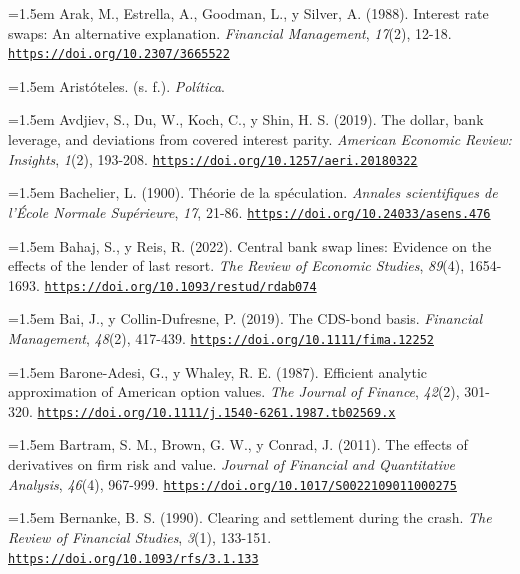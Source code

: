 \documentclass[10pt,a4paper]{article}
\begin{document}
\noindent\hangindent=1.5em Arak, M., Estrella, A., Goodman, L., y Silver, A. (1988). Interest rate swaps: An alternative explanation. \textit{Financial Management}, \textit{17}(2), 12-18. \href{https://doi.org/10.2307/3665522}{\nolinkurl{https://doi.org/10.2307/3665522}}

\noindent\hangindent=1.5em Aristóteles. (s. f.). \textit{Política}.

\noindent\hangindent=1.5em Avdjiev, S., Du, W., Koch, C., y Shin, H. S. (2019). The dollar, bank leverage, and deviations from covered interest parity. \textit{American Economic Review: Insights}, \textit{1}(2), 193-208. \href{https://doi.org/10.1257/aeri.20180322}{\nolinkurl{https://doi.org/10.1257/aeri.20180322}}

\noindent\hangindent=1.5em Bachelier, L. (1900). Théorie de la spéculation. \textit{Annales scientifiques de l'École Normale Supérieure}, \textit{17}, 21-86. \href{https://doi.org/10.24033/asens.476}{\nolinkurl{https://doi.org/10.24033/asens.476}}

\noindent\hangindent=1.5em Bahaj, S., y Reis, R. (2022). Central bank swap lines: Evidence on the effects of the lender of last resort. \textit{The Review of Economic Studies}, \textit{89}(4), 1654-1693. \href{https://doi.org/10.1093/restud/rdab074}{\nolinkurl{https://doi.org/10.1093/restud/rdab074}}

\noindent\hangindent=1.5em Bai, J., y Collin-Dufresne, P. (2019). The CDS-bond basis. \textit{Financial Management}, \textit{48}(2), 417-439. \href{https://doi.org/10.1111/fima.12252}{\nolinkurl{https://doi.org/10.1111/fima.12252}}

\noindent\hangindent=1.5em Barone-Adesi, G., y Whaley, R. E. (1987). Efficient analytic approximation of American option values. \textit{The Journal of Finance}, \textit{42}(2), 301-320. \href{https://doi.org/10.1111/j.1540-6261.1987.tb02569.x}{\nolinkurl{https://doi.org/10.1111/j.1540-6261.1987.tb02569.x}}

\noindent\hangindent=1.5em Bartram, S. M., Brown, G. W., y Conrad, J. (2011). The effects of derivatives on firm risk and value. \textit{Journal of Financial and Quantitative Analysis}, \textit{46}(4), 967-999. \href{https://doi.org/10.1017/S0022109011000275}{\nolinkurl{https://doi.org/10.1017/S0022109011000275}}

\noindent\hangindent=1.5em Bernanke, B. S. (1990). Clearing and settlement during the crash. \textit{The Review of Financial Studies}, \textit{3}(1), 133-151. \href{https://doi.org/10.1093/rfs/3.1.133}{\nolinkurl{https://doi.org/10.1093/rfs/3.1.133}}
\end{document}
